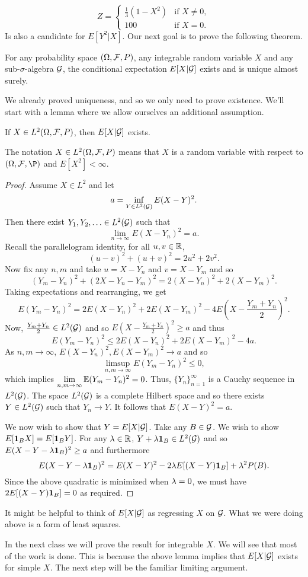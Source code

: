 \[Z = \begin{cases}
    \frac{1}{3}(1-X^2) & \text{if } X \neq 0, \\
    100 & \text{if } X =0.
\end{cases}\]
Is also a candidate for $E[Y^2|X]$. Our next goal is to prove the following theorem.
\begin{theorem}\label{existence}
    For any probability space $({{\Omega}},{\mathcal{F}},P)$, any integrable random variable $X$ and any sub-$\sigma$-algebra ${\mathcal{G}}$, the conditional expectation $E[X|{\mathcal{G}}]$ exists and is unique almost surely.
\end{theorem}
We already proved uniqueness, and so we only need to prove existence. We'll start with a lemma where we allow ourselves an additional assumption.
\begin{lemma}
    If $X \in L^2({{\Omega}},{\mathcal{F}},P)$, then $E[X|{\mathcal{G}}]$ exists.
\end{lemma}
The notation $X \in L^2({{\Omega}},{\mathcal{F}},P)$ means that $X$ is a random variable with respect to $(\Om,\F,\P)$ and $E[X^2] < \infty$.
\begin{proof}
    Assume $X \in L^2$ and let
    \[a = \inf_{Y \in L^2({\mathcal{G}})} E(X-Y)^2. \]
    Then there exist $Y_1,Y_2,\ldots \in L^2({\mathcal{G}})$ such that 
    \[\lim_{n \to \infty} E(X-Y_n)^2 = a. \]
    Recall the parallelogram identity, for all $u,v \in {\mathbb R}$,
    \[(u-v)^2+(u+v)^2 = 2u^2+2v^2. \]
    Now fix any $n,m$ and take $u = X-Y_n$ and $v = X-Y_m$ and so 
    \[(Y_m-Y_n)^2 + (2X-Y_n-Y_m)^2 = 2(X-Y_n)^2+2(X-Y_m)^2. \]
    Taking expectations and rearranging, we get
    \[E(Y_m-Y_n)^2 = 2E(X-Y_n)^2+2E(X-Y_m)^2 - 4E\left(X- \frac{Y_m+Y_n}{2}\right)^2. \]
    Now, $\frac{Y_m+Y_n}{2} \in L^2({\mathcal{G}})$ and so $E\left(X-\frac{Y_m+Y_n}{2}\right)^2 \ge a$ and thus
    \[E(Y_m-Y_n)^2 \le 2E(X-Y_n)^2+2E(X-Y_m)^2 - 4a. \]
    As $n,m \to \infty$, $E(X-Y_n)^2, E(X-Y_m)^2 \to a$ and so 
    \[\limsup_{n,m\to \infty} E(Y_m-Y_n)^2 \le 0, \]
    which implies $\lim\limits_{n,m \to \infty} {\mathbb{E}}(Y_m-Y_n)^2 = 0$. Thus, $\{Y_n\}_{n =1}^\infty$ is a Cauchy sequence in $L^2({\mathcal{G}})$. The space $L^2({\mathcal{G}})$ is a complete Hilbert space and so there exists $Y \in L^2({\mathcal{G}})$ such that $Y_n \to Y$. It follows that $E(X-Y)^2 = a$.

    We now wish to show that $Y = E[X|{\mathcal{G}}]$. Take any $B \in {\mathcal{G}}$. We wish to show $E[{{\bf 1}}_B X] = E[{{\bf 1}}_B Y]$. For any $\lambda \in {\mathbb R}$, $Y+\lambda {{\bf 1}}_B \in L^2({\mathcal{G}})$ and so $E(X-Y-\lambda{{\bf 1}}_B)^2 \ge a$ and furthermore
    \[E(X-Y-\lambda{{\bf 1}}_B)^2 = E(X-Y)^2 -2\lambda E[(X-Y){{\bf 1}}_B] +\lambda^2P(B).\]
    Since the above quadratic is minimized when $\lambda = 0$, we must have $2E[(X-Y){{\bf 1}}_B]=0$ as required.
\end{proof} 
\begin{remark}
    It might be helpful to think of $E[X|{\mathcal{G}}]$ as regressing $X$ on ${\mathcal{G}}$. What we were doing above is a form of least squares.
\end{remark}
In the next class we will prove the result for integrable $X$. We will see that most of the work is done. This is because the above lemma implies that $E[X|{\mathcal{G}}]$ exists for simple $X$. The next step will be the familiar limiting argument.
